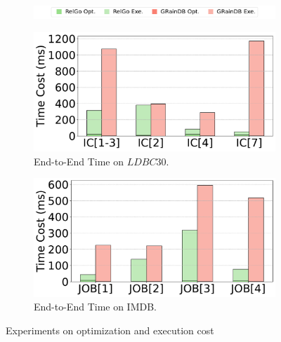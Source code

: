 \begin{figure}[ht]
    \centering
    \begin{subfigure}[b]{\linewidth}
        \centering
        \includegraphics[width=\linewidth]{./figures/exp/opt_exe_legends.pdf}
        \label{fig:exp-opt-legends}
        \vspace*{-2.5ex}
    \end{subfigure}
    \begin{subfigure}[b]{0.48\linewidth}
        \centering
        \includegraphics[width=\linewidth]{./figures/exp/opt_exe_ldbc.pdf}
        \vspace{-1.5em}
        \caption{End-to-End Time on $LDBC30$.}
        \label{fig:exp-opt-ldbc}
    \end{subfigure}
    \begin{subfigure}[b]{0.48\linewidth}
        \centering
        \includegraphics[width=\linewidth]{./figures/exp/opt_exe_job.pdf}
        \vspace{-1.5em}
        \caption{End-to-End Time on IMDB.}
        \label{fig:exp-opt-job}
    \end{subfigure}
    \caption{Experiments on optimization and execution cost}
    \label{fig:exp-optimization}
\end{figure}

